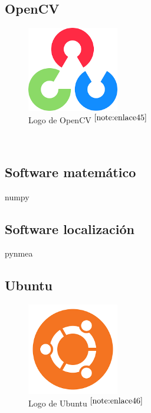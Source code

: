 \setcounter{footnote}{44} %

\subsection{OpenCV}

\begin{figure} [h!]
	\begin{center}
		\includegraphics[width=4cm]{figs/opencv.png}
	\end{center}
	\caption{Logo de OpenCV $^{\ref{note:enlace45}}$} 
	\label{fig:opencv}
\end{figure}\

\setcounter{footnote}{45} %

\subsection{Software matemático}

numpy

\subsection{Software localización}
pynmea

\subsection{Ubuntu}

\begin{figure} [h!]
	\begin{center}
		\includegraphics[width=4cm]{figs/ubuntu.png}
	\end{center}
	\caption{Logo de Ubuntu $^{\ref{note:enlace46}}$} 
	\label{fig:ubuntu}
\end{figure}\

